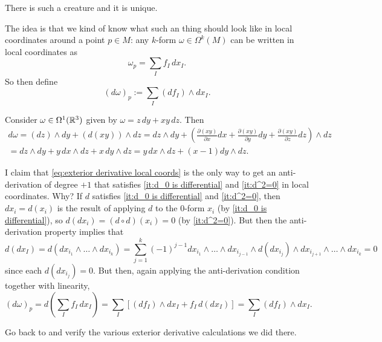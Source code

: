 \begin{proposition}\label{prop:exterior derivative existence and uniqueness}
	There is such a creature and it is unique.
\end{proposition}

The idea is that we kind of know what such an thing should look like in local coordinates around a point $p \in M$: any $k$-form $\omega \in \Omega^k(M)$ can be written in local coordinates as
\[
	\omega_p = \sum_I f_I\, dx_I.
\]
So then define
\begin{equation}\label{eq:exterior derivative local coords}
	(d\omega)_p := \sum_I (df_I) \wedge dx_I.
\end{equation}

\begin{example}\label{ex:1-form in R^3}
	Consider $\omega \in \Omega^1(\mathbb{R}^3)$ given by $\omega = z \, dy + xy \, dz$. Then
	\begin{multline*}
		d\omega = (dz) \wedge dy + (d(xy)) \wedge dz = dz \wedge dy + \left(\frac{\partial (xy)}{\partial x} dx + \frac{\partial (xy)}{\partial y} dy + \frac{\partial (xy)}{\partial z} dz\right) \wedge dz \\
		= dz \wedge dy + y\, dx \wedge dz + x \, dy \wedge dz = y\, dx \wedge dz + (x-1) dy \wedge dz.
	\end{multline*}
\end{example}

I claim that \eqref{eq:exterior derivative local coords} is the only way to get an anti-derivation of degree $+1$ that satisfies \ref{it:d_0 is differential} and \ref{it:d^2=0} in local coordinates. Why? If $d$ satisfies \ref{it:d_0 is differential} and \ref{it:d^2=0}, then $dx_i = d(x_i)$ is the result of applying $d$ to the 0-form $x_i$ (by \ref{it:d_0 is differential}), so $d(dx_i) = (d \circ d)(x_i) = 0$ (by \ref{it:d^2=0}). But then the anti-derivation property implies that
\[
	d(dx_I) = d(dx_{i_1} \wedge \dots \wedge dx_{i_k}) = \sum_{j=1}^k(-1)^{j-1} dx_{i_1} \wedge \dots \wedge dx_{i_{j-1}} \wedge d(dx_{i_j}) \wedge dx_{i_{j+1}} \wedge \dots \wedge dx_{i_k} = 0
\]
since each $d(dx_{i_j}) = 0$. But then, again applying the anti-derivation condition together with linearity,
\[
	(d\omega)_p = d\left(\sum_I f_I\, dx_I\right) = \sum_I \left[ (df_I) \wedge dx_I + f_I\, d(dx_I)\right] = \sum_I (df_I) \wedge dx_I.
\]

\begin{exercise}
	Go back to  and verify the various exterior derivative calculations we did there.
\end{exercise}

